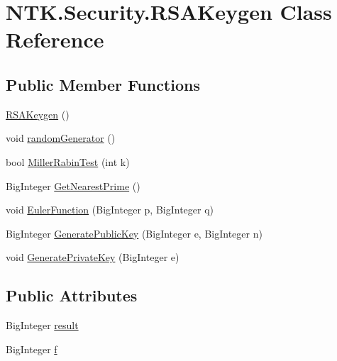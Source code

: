 \hypertarget{class_n_t_k_1_1_security_1_1_r_s_a_keygen}{}\section{N\+T\+K.\+Security.\+R\+S\+A\+Keygen Class Reference}
\label{class_n_t_k_1_1_security_1_1_r_s_a_keygen}
\subsection*{Public Member Functions}
\begin{DoxyCompactItemize}
\item 
\mbox{\hyperlink{class_n_t_k_1_1_security_1_1_r_s_a_keygen_a67688d49c8859826c53d0998b8500515}{R\+S\+A\+Keygen}} ()
\item 
void \mbox{\hyperlink{class_n_t_k_1_1_security_1_1_r_s_a_keygen_a4acced82b2cd5bbebbcb543b5ec21aff}{random\+Generator}} ()
\item 
bool \mbox{\hyperlink{class_n_t_k_1_1_security_1_1_r_s_a_keygen_a2b5b769ac9e69a247f42f2dbfc6ff290}{Miller\+Rabin\+Test}} (int k)
\item 
Big\+Integer \mbox{\hyperlink{class_n_t_k_1_1_security_1_1_r_s_a_keygen_a0df50d9c918ab0c71e598c2c7289d3b9}{Get\+Nearest\+Prime}} ()
\item 
void \mbox{\hyperlink{class_n_t_k_1_1_security_1_1_r_s_a_keygen_aed3c282b4d702ec065fbebdee45038c2}{Euler\+Function}} (Big\+Integer p, Big\+Integer q)
\item 
Big\+Integer \mbox{\hyperlink{class_n_t_k_1_1_security_1_1_r_s_a_keygen_a2a9b1891faf7afd0c574ef2e85b19cb0}{Generate\+Public\+Key}} (Big\+Integer e, Big\+Integer n)
\item 
void \mbox{\hyperlink{class_n_t_k_1_1_security_1_1_r_s_a_keygen_ae55e5ebe32387a62267903f964184d8b}{Generate\+Private\+Key}} (Big\+Integer e)
\end{DoxyCompactItemize}
\subsection*{Public Attributes}
\begin{DoxyCompactItemize}
\item 
Big\+Integer \mbox{\hyperlink{class_n_t_k_1_1_security_1_1_r_s_a_keygen_ac50802718c92927190923a5ba75263ff}{result}}
\item 
Big\+Integer \mbox{\hyperlink{class_n_t_k_1_1_security_1_1_r_s_a_keygen_a38d253e3c2f4c9680392e7627a0b166b}{f}}
\end{DoxyCompactItemize}


